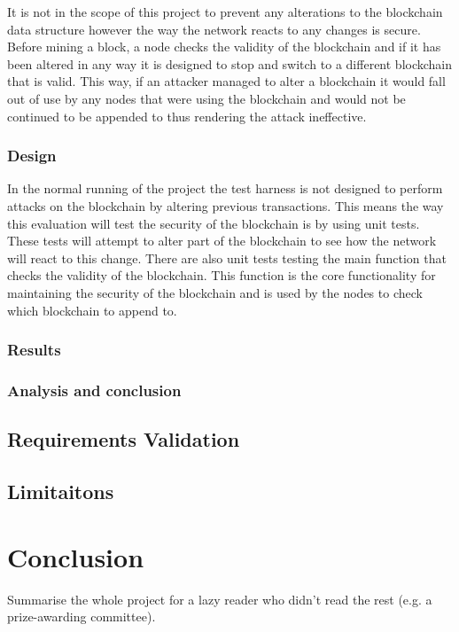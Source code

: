 \documentclass{l4proj}
\begin{document}
It is not in the scope of this project to prevent any alterations to the blockchain data structure however the way the
network reacts to any changes is secure. Before mining a block, a node checks the validity of the blockchain and if it
has been altered in any way it is designed to stop and switch to a different blockchain that is valid. This way, if an
attacker managed to alter a blockchain it would fall out of use by any nodes that were using the blockchain and would
not be continued to be appended to thus rendering the attack ineffective.
\subsection{Design}
In the normal running of the project the test harness is not designed to perform attacks on the blockchain by altering
previous transactions. This means the way this evaluation will test the security of the blockchain is by using unit tests.
These tests will attempt to alter part of the blockchain to see how the network will react to this change. There are also
unit tests testing the main function that checks the validity of the blockchain. This function is the core functionality
for maintaining the security of the blockchain and is used by the nodes to check which blockchain to append to.

\subsection{Results}
\subsection{Analysis and conclusion}

\section{Requirements Validation}

\section{Limitaitons}

\chapter{Conclusion}    
Summarise the whole project for a lazy reader who didn't read the rest (e.g. a prize-awarding committee).
\end{document}
